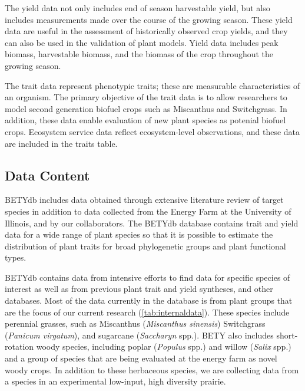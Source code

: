 \documentclass[10pt]{article}
\begin{document}
 The yield data not only includes end of season harvestable yield, but also includes measurements made over the course of the growing season.
 These yield data are useful in the assessment of historically observed crop yields, and they can also be used in the validation of plant models.
 Yield data includes peak biomass, harvestable biomass, and the biomass of the crop throughout the growing season.

 The trait data represent phenotypic traits; these are measurable characteristics of an organism.
 The primary objective of the trait data is to allow researchers to model second generation biofuel crops such as Miscanthus and Switchgrass. 
 In addition, these data enable evaluation of new plant species as potenial biofuel crops.
 Ecosystem service data reflect ecosystem-level observations, and these data are included in the traits table.

\subsection{Data Content}
 BETYdb includes data obtained through extensive literature review of target species in addition to data collected from the Energy Farm at the  University of Illinois, and by our collaborators. 
 The BETYdb database contains trait and yield data for a wide range of plant species so that it is possible to estimate the distribution of plant traits for broad phylogenetic groups and plant functional types.

 BETYdb contains data from intensive efforts to find data for specific species of interest as well as from previous plant trait and yield syntheses, and other databases.%
 Most of the data currently in the database is from plant groups that are the focus of our current research (\autoref{tab:internaldata}).
 These species include perennial grasses, such as Miscanthus (\textit{Miscanthus sinensis}) Switchgrass (\textit{Panicum virgatum}), and sugarcane (\textit{Saccharyn} spp.).
 BETY also includes short-rotation woody species, including poplar (\textit{Populus} spp.) and willow (\textit{Salix} spp.) and a group of species that are being evaluated at the energy farm as novel woody crops.
 In addition to these herbaceous species, we are collecting data from a species in an experimental low-input, high diversity prairie. 
\end{document}

